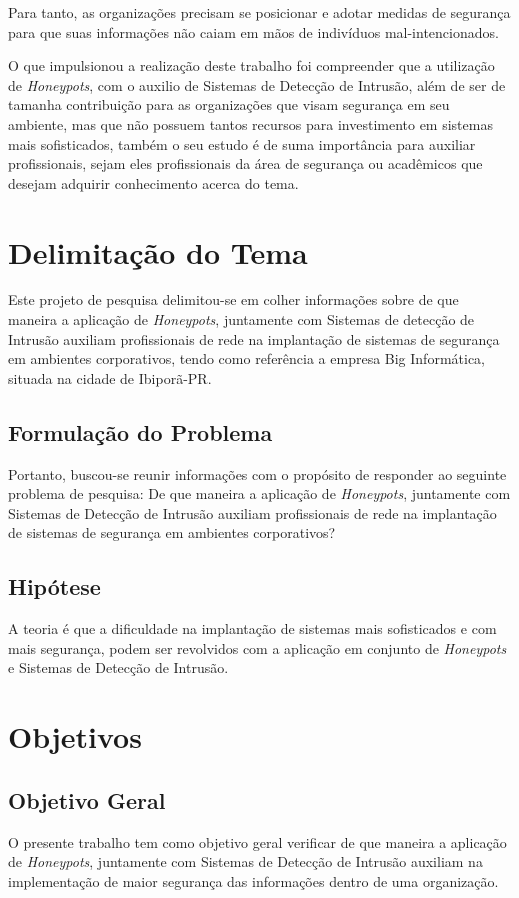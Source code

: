Para tanto, as organizações precisam se posicionar e adotar medidas de segurança para que suas informações não caiam em mãos de indivíduos mal-intencionados.

O que impulsionou a realização deste trabalho foi compreender que a utilização de \textit{Honeypots}, com o auxilio de Sistemas de Detecção de Intrusão, além de ser de tamanha contribuição para as organizações que visam segurança em seu ambiente, mas que não possuem tantos recursos para investimento em sistemas mais sofisticados, também o seu estudo é de suma importância para auxiliar profissionais, sejam eles profissionais da área de segurança ou acadêmicos que desejam adquirir conhecimento acerca do tema.

\section{Delimitação do Tema}
Este projeto de pesquisa delimitou-se em colher informações sobre de que maneira a aplicação de \textit{Honeypots}, juntamente com Sistemas de detecção de Intrusão auxiliam profissionais de rede na implantação de sistemas de segurança em ambientes corporativos, tendo como referência a empresa Big Informática, situada na cidade de Ibiporã-PR.

\subsection{Formulação do Problema} %
Portanto, buscou-se reunir informações com o propósito de responder ao seguinte problema de pesquisa: De que maneira a aplicação de \textit{Honeypots}, juntamente com Sistemas de Detecção de Intrusão auxiliam profissionais de rede na implantação de sistemas de segurança em ambientes corporativos?

\subsection{Hipótese}
A teoria é que a dificuldade na implantação de sistemas mais sofisticados e com mais segurança, podem ser revolvidos com a aplicação em conjunto de \textit{Honeypots} e Sistemas de Detecção de Intrusão.

\section{Objetivos}

\subsection{Objetivo Geral}
O presente trabalho tem como objetivo geral verificar de que maneira a aplicação de \textit{Honeypots}, juntamente com Sistemas de Detecção de Intrusão auxiliam na implementação de maior segurança das informações dentro de uma organização.

